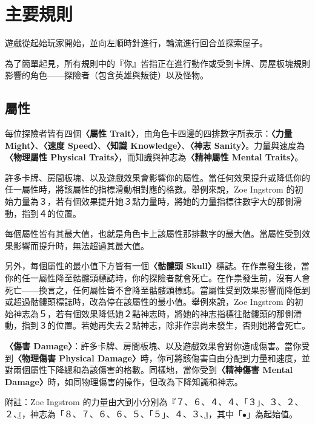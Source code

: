 
\section{主要規則} \label{sec:main}

遊戲從起始玩家開始，並向左順時針進行，輪流進行回合並探索屋子。

為了簡單起見，所有規則中的『你』皆指正在進行動作或受到卡牌、房屋板塊規則影響的角色——探險者（包含英雄與叛徒）以及怪物。


\subsection{屬性} \label{ssec:traits}

每位探險者皆有四個\textbf{〈屬性 Trait〉}，由角色卡四邊的四排數字所表示：\textbf{〈力量 Might〉}、\textbf{〈速度 Speed〉}、\textbf{〈知識 Knowledge〉}、\textbf{〈神志 Sanity〉}。力量與速度為\textbf{〈物理屬性 Physical Traits〉}，而知識與神志為\textbf{〈精神屬性 Mental Traits〉}。

許多卡牌、房間板塊、以及遊戲效果會影響你的屬性。當任何效果提升或降低你的任一屬性時，將該屬性的指標滑動相對應的格數。舉例來說，Zoe Ingstrom 的初始力量為３，若有個效果提升她３點力量時，將她的力量指標往數字大的那側滑動，指到４的位置。

每個屬性皆有其最大值，也就是角色卡上該屬性那排數字的最大值。當屬性受到效果影響而提升時，無法超過其最大值。

另外，每個屬性的最小值下方皆有一個\textbf{〈骷髏頭 Skull〉}\SkullSymbol{}標誌。在作祟發生後，當你的任一屬性降至骷髏頭標誌時，你的探險者就會死亡。在作祟發生前，沒有人會死亡——換言之，任何屬性皆不會降至骷髏頭標誌。當屬性受到效果影響而降低到或超過骷髏頭標誌時，改為停在該屬性的最小值。舉例來說，Zoe Ingstrom 的初始神志為５，若有個效果降低她２點神志時，將她的神志指標往骷髏頭的那側滑動，指到３的位置。若她再失去２點神志，除非作祟尚未發生，否則她將會死亡。

\textbf{〈傷害 Damage〉}：許多卡牌、房間板塊、以及遊戲效果會對你造成傷害。當你受到\textbf{〈物理傷害 Physical Damage〉}時，你可將該傷害自由分配到力量和速度，並對兩個屬性下降總和為該傷害的格數。同樣地，當你受到\textbf{〈精神傷害 Mental Damage〉}時，如同物理傷害的操作，但改為下降知識和神志。

附註：Zoe Ingstrom 的力量由大到小分別為『７、６、４、４、\textcolor{green!50!black}{「３」}、３、２、２、\SkullSymbol{}』，神志為「８、７、６、６、５、\textcolor{green!50!black}{「５」}、４、３、\SkullSymbol{}』，其中「$\bullet$」為起始值。

